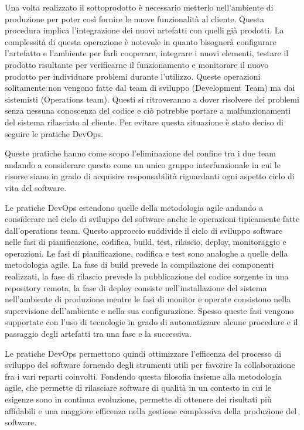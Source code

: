 Una volta realizzato il sottoprodotto è necessario metterlo nell'ambiente di produzione per poter così fornire le nuove funzionalità al cliente.
Questa procedura implica l'integrazione dei nuovi artefatti con quelli già prodotti.
La complessità di questa operazione è notevole in quanto bisognerà configurare l'artefatto e l'ambiente per farli cooperare, integrare i nuovi elementi, testare il prodotto risultante
per verificarne il funzionamento e monitorare il nuovo prodotto per individuare problemi durante l'utilizzo.
Queste operazioni solitamente non vengono fatte dal team di sviluppo (Development Team) ma dai sistemisti (Operations team).
Questi si ritroveranno a dover risolvere dei problemi senza nessuna conoscenza del codice e ciò potrebbe portare a malfunzionamenti del sistema rilasciato al cliente.
Per evitare questa situazione è stato deciso di seguire le pratiche DevOps.

Queste pratiche hanno come scopo l'eliminazione del confine tra i due team andando a considerare questo come un unico gruppo interfunzionale in cui le risorse
siano in grado di acquisire responsabilità riguardanti ogni aspetto ciclo di vita del software.

Le pratiche DevOps estendono quelle della metodologia agile andando a considerare nel ciclo di sviluppo del software
anche le operazioni tipicamente fatte dall'operations team.
Questo approccio suddivide il ciclo di sviluppo software nelle fasi di pianificazione, codifica, build, test, rilascio, deploy, monitoraggio e operazioni.
Le fasi di pianificazione, codifica e test sono analoghe a quelle della metodologia agile. La fase di build prevede la compilazione dei componenti realizzati,
la fase di rilascio prevede la pubblicazione del codice sorgente in una repository remota, la fase di deploy consiste nell'installazione del sistema nell'ambiente di produzione
mentre le fasi di monitor e operate consistono nella supervisione dell'ambiente e nella sua configurazione.
Spesso queste fasi vengono supportate con l'uso di tecnologie in grado di automatizzare alcune procedure e il passaggio degli artefatti tra una fase e la successiva.

Le pratiche DevOps permettono quindi ottimizzare l'efficenza del processo di sviluppo del software fornendo degli strumenti utili per favorire la collaborazione fra i vari reparti coinvolti.
Fondendo questa filosofia insieme alla metodologia agile, che permette di rilasciare software di qualità in un contesto in cui le esigenze sono in continua evoluzione,
permette di ottenere dei risultati più affidabili e una maggiore efficenza nella gestione complessiva della produzione del software.

